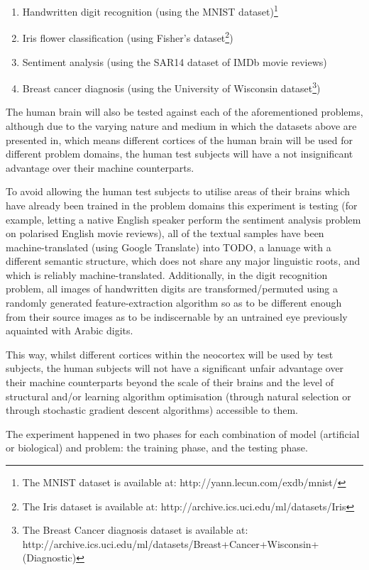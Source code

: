 \documentclass[]{report}
\begin{document}
\begin{enumerate}
	\item Handwritten digit recognition (using the MNIST dataset)\footnote{The MNIST dataset is available at: http://yann.lecun.com/exdb/mnist/}
	\item Iris flower classification (using Fisher's dataset\footnote{The Iris dataset is available at: http://archive.ics.uci.edu/ml/datasets/Iris})
	\item Sentiment analysis (using the SAR14 dataset of IMDb movie reviews)
	\item Breast cancer diagnosis (using the University of Wisconsin dataset\footnote{The Breast Cancer diagnosis dataset is available at: http://archive.ics.uci.edu/ml/datasets/Breast+Cancer+Wisconsin+(Diagnostic)})
\end{enumerate}

The human brain will also be tested against each of the aforementioned problems, although due to the varying nature and medium in which the datasets above are presented in, which means different cortices of the human brain will be used for different problem domains, the human test subjects will have a not insignificant advantage over their machine counterparts.

To avoid allowing the human test subjects to utilise areas of their brains which have already been trained in the problem domains this experiment is testing (for example, letting a native English speaker perform the sentiment analysis problem on polarised English movie reviews), all of the textual samples have been machine-translated (using Google Translate) into TODO, a lanuage with a different semantic structure, which does not share any major linguistic roots, and which is reliably machine-translated. Additionally, in the digit recognition problem, all images of handwritten digits are transformed/permuted using a randomly generated feature-extraction algorithm so as to be different enough from their source images as to be indiscernable by an untrained eye previously aquainted with Arabic digits.

This way, whilst different cortices within the neocortex will be used by test subjects, the human subjects will not have a significant unfair advantage over their machine counterparts beyond the scale of their brains and the level of structural and/or learning algorithm optimisation (through natural selection or through stochastic gradient descent algorithms) accessible to them.

The experiment happened in two phases for each combination of model (artificial or biological) and problem: the training phase, and the testing phase.
\end{document}
